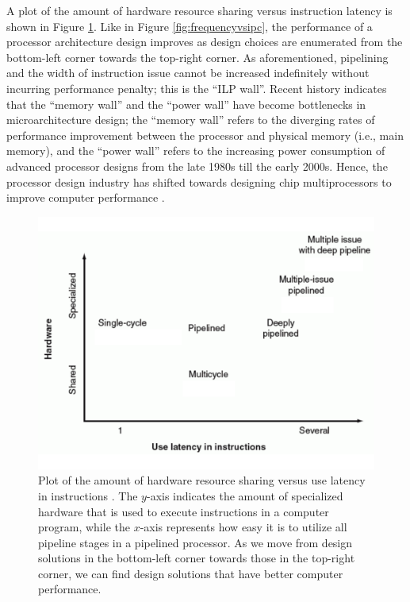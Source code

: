 A plot of the amount of hardware resource sharing versus instruction latency is shown in Figure \ref{fig:amountofhwsharingvsinstructionlatency}. Like in Figure \ref{fig:frequencyvsipc}, the performance of a processor architecture design improves as design choices are enumerated from the bottom-left corner towards the top-right corner. As aforementioned, pipelining and the width of instruction issue cannot be increased indefinitely without incurring performance penalty; this is the ``ILP wall''. Recent history indicates that the ``memory wall'' and the ``power wall'' have become bottlenecks in microarchitecture design; the ``memory wall'' refers to the diverging rates of performance improvement between the processor and physical memory (i.e., main memory), and the ``power wall'' refers to the increasing power consumption of advanced processor designs from the late 1980s till the early 2000s. Hence, the processor design industry has shifted towards designing chip multiprocessors to improve computer performance \cite{Hennessy2012,Wulf1995}. \\

\begin{figure}[h]
\centering 
\includegraphics[width=6in]{./pics/amount-of-hw-sharing-vs-instruction-latency}
\caption{Plot of the amount of hardware resource sharing versus use latency in instructions \cite{Patterson2005}. The $y$-axis indicates the amount of specialized hardware that is used to execute instructions in a computer program, while the $x$-axis represents how easy it is to utilize all pipeline stages in a pipelined processor. As we move from design solutions in the bottom-left corner towards those in the top-right corner, we can find design solutions that have better computer performance.}
\label{fig:amountofhwsharingvsinstructionlatency}
\end{figure}



